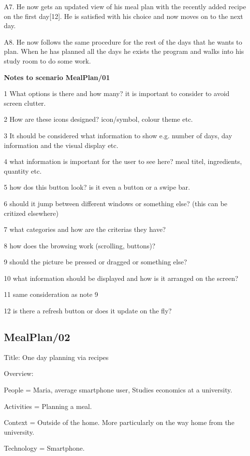 	A7. He now gets an updated view of his meal plan with the recently added recipe on the first day[12]. He is satisfied with his choice and now moves on to the next day. 
	
	A8. He now follows the same procedure for the rest of the days that he wants to plan. When he has planned all the days he exists the program and walks into his study room to do some work.
	
\textbf{Notes to scenario MealPlan/01}

1 What options is there and how many? it is important to consider to avoid screen clutter.

2 How are these icons designed? icon/symbol, colour theme etc.

3 It should be considered what information to show e.g. number of days, day information and the visual display etc.

4 what information is important for the user to see here? meal titel, ingredients, quantity etc.

5 how dos this button look? is it even a button or a swipe bar.

6 should it jump between different windows or something else? (this can be critized elsewhere)

7 what categories and how are the criterias they have?

8 how does the browsing work (scrolling, buttons)?

9 should the picture be pressed or dragged or something else?

10 what information should be displayed and how is it arranged on the screen?

11 same consideration as note 9

12 is there a refresh button or does it update on the fly?

\subsection{MealPlan/02} \label{MealPlan02}

Title: One day planning via recipes

Overview:

	People = Maria, average smartphone user, Studies economics at a university. 
	
	Activities = Planning a meal.

	Context = Outside of the home. More particularly on the way home from the university.

	Technology = Smartphone.

